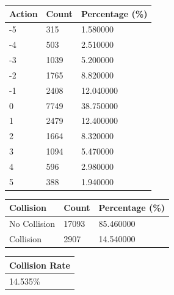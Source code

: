 \bigskip

\bigskip\noindent
\begin{tabular}{p{}p{}p{}}
\toprule
Action & Count & Percentage (\%) \\
\hline
-5 & 315 & 1.580000 \\
-4 & 503 & 2.510000 \\
-3 & 1039 & 5.200000 \\
-2 & 1765 & 8.820000 \\
-1 & 2408 & 12.040000 \\
0 & 7749 & 38.750000 \\
1 & 2479 & 12.400000 \\
2 & 1664 & 8.320000 \\
3 & 1094 & 5.470000 \\
4 & 596 & 2.980000 \\
5 & 388 & 1.940000 \\
\bottomrule
\end{tabular}

\bigskip

\bigskip\noindent
\begin{tabular}{p{}p{}p{}}
\toprule
Collision & Count & Percentage (\%) \\
\hline
No Collision & 17093 & 85.460000 \\
Collision & 2907 & 14.540000 \\
\bottomrule
\end{tabular}

\bigskip

\bigskip\noindent
\begin{tabular}{p{\dimexpr \linewidth-2\tabcolsep}}
\toprule
Collision Rate \\
\hline
14.535\% \\
\bottomrule
\end{tabular}

\bigskip

